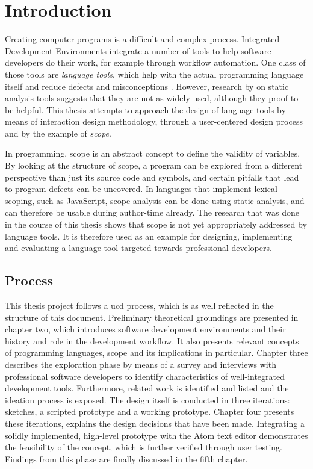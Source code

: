 \chapter{Introduction}\label{introduction}

Creating computer programs is a difficult and complex process.
Integrated Development Environments integrate a number of tools to help
software developers do their work, for example through workflow
automation. One class of those tools are \emph{language tools}, which
help with the actual programming language itself and reduce defects and
misconceptions \cite{hidayat}. However, research by
 on static analysis tools suggests that they
are not as widely used, although they proof to be helpful. This thesis
attempts to approach the design of language tools by means of
interaction design methodology, through a user-centered design process
and by the example of \emph{scope}.

In programming, scope is an abstract concept to define the validity of
variables. By looking at the structure of scope, a program can be
explored from a different perspective than just its source code and
symbols, and certain pitfalls that lead to program defects can be
uncovered. In languages that implement lexical scoping, such as
JavaScript, scope analysis can be done using static analysis, and can
therefore be usable during author-time already. The research that was
done in the course of this thesis shows that scope is not yet
appropriately addressed by language tools. It is therefore used as an
example for designing, implementing and evaluating a language tool
targeted towards professional developers.

\section{Process}\label{process}

This thesis project follows a \acl{ucd} process, which is as well
reflected in the structure of this document. Preliminary theoretical
groundings are presented in chapter two, which introduces software
development environments and their history and role in the development
workflow. It also presents relevant concepts of programming languages,
scope and its implications in particular. Chapter three describes the
exploration phase by means of a survey and interviews with professional
software developers to identify characteristics of well-integrated
development tools. Furthermore, related work is identified and listed
and the ideation process is exposed. The design itself is conducted in
three iterations: sketches, a scripted prototype and a working
prototype. Chapter four presents these iterations, explains the design
decisions that have been made. Integrating a solidly implemented,
high-level prototype with the Atom text editor demonstrates the
feasibility of the concept, which is further verified through user
testing. Findings from this phase are finally discussed in the fifth
chapter.

